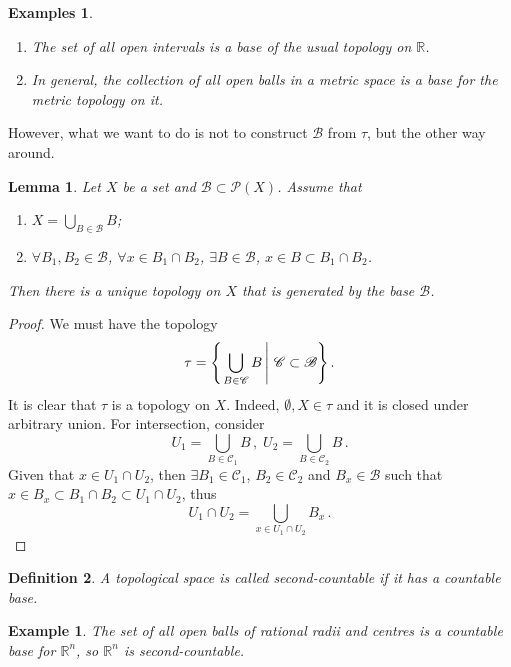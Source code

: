\documentclass{article}
\theoremstyle{plain}\theoremheaderfont{\normalfont\itshape}\theorembodyfont{\rmfamily}\theoremseparator{.}\newtheorem*{rem}{Remark}\newtheorem*{ex}{Example}\newtheorem*{proof}{Proof}\newtheorem*{altp}{Alternative proof}
\theoremstyle{plain}\theoremheaderfont{\normalfont\bfseries}\theorembodyfont{\rmfamily}\theoremseparator{.}\newtheorem{thm}{Theorem}[section]\newtheorem{lem}[thm]{Lemma}\newtheorem{prop}[thm]{Proposition}\newtheorem*{cor}{Corollary}\newtheorem{defn}[thm]{Definition}\newtheorem{clm}[thm]{Claim}\newtheorem{clminproof}{Claim}
\theoremstyle{break}\theoremheaderfont{\normalfont\itshape}\theorembodyfont{\rmfamily}\theoremseparator{.\medskip}\newtheorem*{proofskip}{Proof}\newtheorem*{exs}{Examples}\newtheorem*{rems}{Remarks}
\theoremstyle{break}\theoremheaderfont{\normalfont\bfseries}\theorembodyfont{\rmfamily}\theoremseparator{.\medskip}\newtheorem{lemskip}[thm]{Lemma}\newtheorem{defnskip}[thm]{Definition}\newtheorem{propskip}[thm]{Proposition}\newtheorem{thmskip}[thm]{Theorem}
\begin{document}
    \begin{exs}
        \begin{enumerate}[label=(\roman*),topsep=0pt]
            \item The set of all open intervals is a base of the usual topology on \(\mathbb{R}\). 
            \item In general, the collection of all open balls in a metric space is a base for the metric topology on it.
        \end{enumerate}
    \end{exs}
    
    However, what we want to do is not to construct \(\mathscr{B}\) from \(\tau\), but the other way around.

    \begin{lem}
        Let \(X\) be a set and \(\mathscr{B}\subset\mathcal{P}(X)\). Assume that
        \begin{enumerate}[label=(\roman*),topsep=0pt]
            \item \(X=\bigcup_{B\in\mathscr{B}}B\);
            \item \(\forall B_1,B_2\in\mathscr{B}\), \(\forall x\in B_1\cap B_2\), \(\exists B\in\mathscr{B}\), \(x\in B\subset B_1\cap B_2\).
        \end{enumerate}
        Then there is a unique topology on \(X\) that is generated by the base \(\mathscr{B}\).
    \end{lem}
    \begin{proof}
        We must have the topology
        \[\tau=\qty{\left.\bigcup_{B\in\mathscr{C}}B\,\right|\,\mathscr{C}\subset\mathscr{B}}\,.\]
        It is clear that \(\tau\) is a topology on \(X\). Indeed, \(\emptyset,X\in\tau\) and it is closed under arbitrary union. For intersection, consider
        \[U_1=\bigcup_{B\in\mathscr{C}_1}B\,,\;U_2=\bigcup_{B\in\mathscr{C}_2}B\,.\]
        Given that \(x\in U_1\cap U_2\), then \(\exists B_1\in\mathscr{C}_1\), \(B_2\in\mathscr{C}_2\) and \(B_x\in\mathscr{B}\) such that \(x\in B_x\subset B_1\cap B_2\subset U_1\cap U_2\), thus
        \[U_1\cap U_2=\bigcup_{x\in U_1\cap U_2}B_x\,.\]
    \end{proof}

    \begin{defn}
        A topological space is called \textit{second-countable} if it has a countable base.
    \end{defn}
    \begin{ex}
        The set of all open balls of rational radii and centres is a countable base for \(\mathbb{R}^n\), so \(\mathbb{R}^n\) is second-countable.
    \end{ex}
\end{document}
